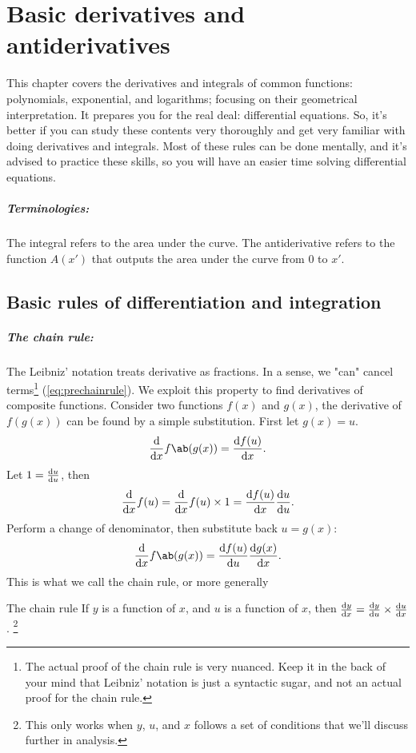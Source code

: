 \chapter{Basic derivatives and antiderivatives}
\label{sec:basic-derivatives-and-integrals}

This chapter covers the derivatives and integrals of common functions: polynomials, exponential, and logarithms; focusing on their geometrical interpretation. It prepares you for the real deal:  differential equations. So, it's better if you can study these contents very thoroughly and get very familiar with doing derivatives and integrals. Most of these rules can be done mentally, and it's advised to practice these skills, so you will have an easier time solving differential equations.


\paragraph{Terminologies:} The integral refers to the area under the curve. The antiderivative refers to the function $A(x')$ that outputs the area under the curve from $0$ to $x'$.

\section{Basic rules of differentiation and integration}
\label{sec:trivial_rules}

\paragraph{The chain rule:}The Leibniz' notation treats derivative as fractions. In a sense, we "can" cancel terms\footnote{The actual proof of the chain rule is very nuanced. Keep it in the back of your mind that Leibniz' notation is just a syntactic sugar, and not an actual proof for the chain rule.} (\cref{eq:prechainrule}). We exploit this property to find derivatives of composite functions. Consider two functions $f(x)$ and $g(x)$, the derivative of $f(g(x))$ can be found by a simple substitution. First let $g(x) = u$.
\begin{equation*}
  \odv*{f\ab(g(x))}{x} = \odv{f(u)}{x}.
\end{equation*}
Let $1 = \odv{u}{u}$, then
\begin{equation*}
  \odv*{f(u)}{x} = \odv*{f(u)}{x} \times 1 = \odv{f(u)}{x} \odv{u}{u}.
\end{equation*}
Perform a change of denominator, then substitute back $u = g(x)$:
\begin{equation*}
  \odv*{f\ab(g(x))}{x} = \odv{f(u)}{u}\odv{g(x)}{x}.
\end{equation*}
This is what we call the chain rule, or more generally
\begin{prop}{The chain rule}{}
  If \(y\) is a function of \(x\), and \(u\) is a function of \(x\), then \(\odv{y}{x} = \odv{y}{u} \times \odv{u}{x}\).
  \footnote{This only works when \(y\), \(u\), and \(x\) follows a set of conditions that we'll discuss further in analysis.}
\end{prop}

